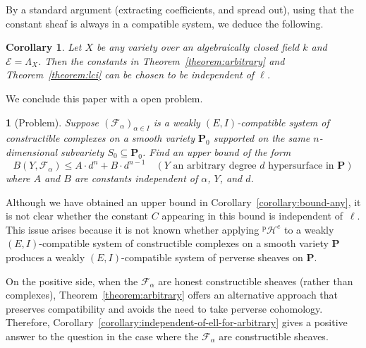 \documentclass[english]{smfart}
\renewcommand{\mathbb}{\mathbf}
\renewcommand{\leq}{\leqslant}
\renewcommand{\subset}{\subseteq}
\theoremstyle{remark}
\theoremstyle{plain}
\newtheorem{corollary}[remark]{Corollary}
\theoremstyle{definition}
\numberwithin{equation}{remark}
\theoremstyle{void}
\newtheorem{situation}[remark]{}
\begin{document}
By a standard argument (extracting coefficients, and spread out),
using that the constant sheaf is always in a compatible system,
we deduce the following.

\begin{corollary}
Let \(X\) be any variety over an algebraically closed field \(k\)
and \(\mathcal{E} = \Lambda_X\).
Then the constants in Theorem~\ref{theorem:arbitrary} and Theorem~\ref{theorem:lci} can be chosen to be independent of \(\ell\).
\end{corollary}

We conclude this paper with a open problem.

\begin{situation}
[Problem]
\textit{Suppose \((\mathcal{F}_{\alpha})_{\alpha\in I}\) is a weakly
  \((E,I)\)-compatible system of constructible complexes on a smooth
  variety \(\mathbb{P}_{0}\) supported on the same \(n\)-dimensional
  subvariety \(S_{0} \subset \mathbb{P}_{0}\).  Find an upper bound of the
  form
\[
B(Y, \mathcal{F}_{\alpha}) \leq A \cdot d^n + B \cdot d^{n-1}
\quad (Y \text{ an arbitrary degree } d \text{ hypersurface in } \mathbb{P})
\]
where \(A\) and \(B\) are constants independent of \(\alpha\), \(Y\), and \(d\).}
\end{situation}

Although we have obtained an upper bound in Corollary~\ref{corollary:bound-any},
it is not clear whether the constant \(C\) appearing in this bound is independent
of~\(\ell\).  This issue arises because it is not known whether applying
\({}^{\mathrm{p}}\mathcal{H}^{e}\) to a weakly \((E, I)\)-compatible system
of constructible complexes on a smooth variety \(\mathbb{P}\) produces a
weakly \((E, I)\)-compatible system of perverse sheaves on \(\mathbb{P}\).

On the positive side, when the \(\mathcal{F}_{\alpha}\)
are honest constructible sheaves
(rather than complexes),
Theorem~\ref{theorem:arbitrary} offers an alternative approach that preserves
compatibility and avoids the need to take perverse cohomology.
Therefore, Corollary~\ref{corollary:independent-of-ell-for-arbitrary} gives
a positive answer to the question in the case where the
\(\mathcal{F}_{\alpha}\) are
constructible sheaves.


\printbibliography
\end{document}
